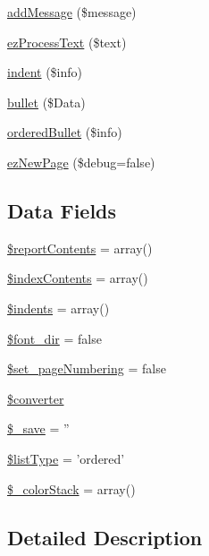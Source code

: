 \begin{DoxyCompactItemize}
\hyperlink{classphpdocpdf_a0fe60161c19f81f49f76a2dcb95d48e4}{add\-Message} (\$message)
\item 
\hyperlink{classphpdocpdf_a5a002788a14c3f940657f48faca602cc}{ez\-Process\-Text} (\$text)
\item 
\hyperlink{classphpdocpdf_af6c01122849081a9a24742157dcb27d1}{indent} (\$info)
\item 
\hyperlink{classphpdocpdf_a73ee1579a8d9518cc0266895f0c8e318}{bullet} (\$\-Data)
\item 
\hyperlink{classphpdocpdf_ae6a6f2764cdee70d7ebd4621612db9ae}{ordered\-Bullet} (\$info)
\item 
\hyperlink{classphpdocpdf_a428ff8a80fae37486f2987c439d58698}{ez\-New\-Page} (\$debug=false)
\end{DoxyCompactItemize}
\subsection*{\-Data \-Fields}
\begin{DoxyCompactItemize}
\item 
\hyperlink{classphpdocpdf_ad3005b139ad3402ca55acbbccb0e01c8}{\$report\-Contents} = array()
\item 
\hyperlink{classphpdocpdf_aa2bd60a8431bd94e4bb0886b33a2d2f1}{\$index\-Contents} = array()
\item 
\hyperlink{classphpdocpdf_a5d445fd9cf0eabfcf384208e4c4b21e0}{\$indents} = array()
\item 
\hyperlink{classphpdocpdf_a06be9cafb55b954edd7136b6cadedc8d}{\$font\-\_\-dir} = false
\item 
\hyperlink{classphpdocpdf_ae4b30f7632b21804105d7c41da264747}{\$set\-\_\-page\-Numbering} = false
\item 
\hyperlink{classphpdocpdf_afe855bed1378ec1af29ce232a1b7b850}{\$converter}
\item 
\hyperlink{classphpdocpdf_ab9befc6a4ff6463cf544012c09097c11}{\$\-\_\-save} = ''
\item 
\hyperlink{classphpdocpdf_a21422b75c7f496639082da4a1e327a64}{\$list\-Type} = 'ordered'
\item 
\hyperlink{classphpdocpdf_ad7ea642f86812b6a27adb7aafb8b9f4a}{\$\-\_\-color\-Stack} = array()
\end{DoxyCompactItemize}


\subsection{\-Detailed \-Description}



